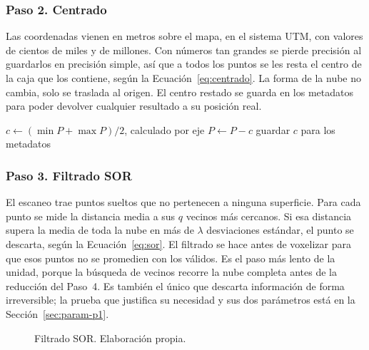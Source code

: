 \FloatBarrier
\subsubsection*{Paso 2. Centrado}
\label{sec:u1-p2}

Las coordenadas vienen en metros sobre el mapa, en el sistema UTM, con valores
de cientos de miles y de millones. Con números tan grandes se pierde precisión
al guardarlos en precisión simple, así que a todos los puntos se les resta el
centro de la caja que los contiene, según la Ecuación~\ref{eq:centrado}. La
forma de la nube no cambia, solo se traslada al origen. El centro restado se
guarda en los metadatos para poder devolver cualquier resultado a su posición
real.

\begin{algorithm}[H]
\small
\caption{Paso 2 del Módulo~1, centrado.}
$c \leftarrow (\min P + \max P)/2$, calculado por eje\;
$P \leftarrow P - c$\;
guardar $c$ para los metadatos\;
\end{algorithm}

\FloatBarrier
\subsubsection*{Paso 3. Filtrado SOR}
\label{sec:u1-p3}

El escaneo trae puntos sueltos que no pertenecen a ninguna superficie. Para cada
punto se mide la distancia media a sus $q$ vecinos más cercanos. Si esa distancia
supera la media de toda la nube en más de $\lambda$ desviaciones estándar, el
punto se descarta, según la Ecuación~\ref{eq:sor}. El filtrado se hace antes de
voxelizar para que esos puntos no se promedien con los válidos. Es el paso más
lento de la unidad, porque la búsqueda de vecinos recorre la nube completa antes
de la reducción del Paso~4. Es también el único que descarta información de forma
irreversible; la prueba que justifica su necesidad y sus dos parámetros está en la
Sección~\ref{sec:param-p1}.

\begin{figure}[!htbp]
\centering{}
\caption[Filtrado SOR]{Filtrado SOR. Elaboración propia.}
\end{figure}

